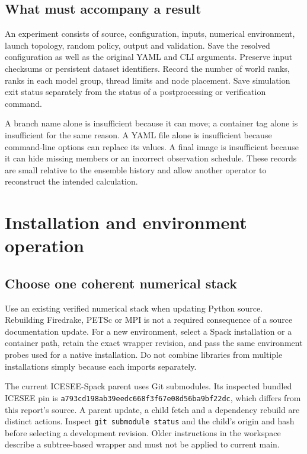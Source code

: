 \documentclass[11pt,a4paper]{article}
\newcommand{\code}[1]{\nolinkurl{#1}}
\begin{document}
\subsection{What must accompany a result}
An experiment consists of source, configuration, inputs, numerical environment, launch topology, random policy, output and validation. Save the resolved configuration as well as the original YAML and CLI arguments. Preserve input checksums or persistent dataset identifiers. Record the number of world ranks, ranks in each model group, thread limits and node placement. Save simulation exit status separately from the status of a postprocessing or verification command.

A branch name alone is insufficient because it can move; a container tag alone is insufficient for the same reason. A YAML file alone is insufficient because command-line options can replace its values. A final image is insufficient because it can hide missing members or an incorrect observation schedule. These records are small relative to the ensemble history and allow another operator to reconstruct the intended calculation.

\section{Installation and environment operation}
\subsection{Choose one coherent numerical stack}
Use an existing verified numerical stack when updating Python source. Rebuilding Firedrake, PETSc or MPI is not a required consequence of a source documentation update. For a new environment, select a Spack installation or a container path, retain the exact wrapper revision, and pass the same environment probes used for a native installation. Do not combine libraries from multiple installations simply because each imports separately.

The current ICESEE-Spack parent uses Git submodules. Its inspected bundled ICESEE pin is \code{a793cd198ab39eedc668f3f67e08d56ba9bf22dc}, which differs from this report's source. A parent update, a child fetch and a dependency rebuild are distinct actions. Inspect \code{git submodule status} and the child's origin and hash before selecting a development revision. Older instructions in the workspace describe a subtree-based wrapper and must not be applied to current main.
\end{document}
